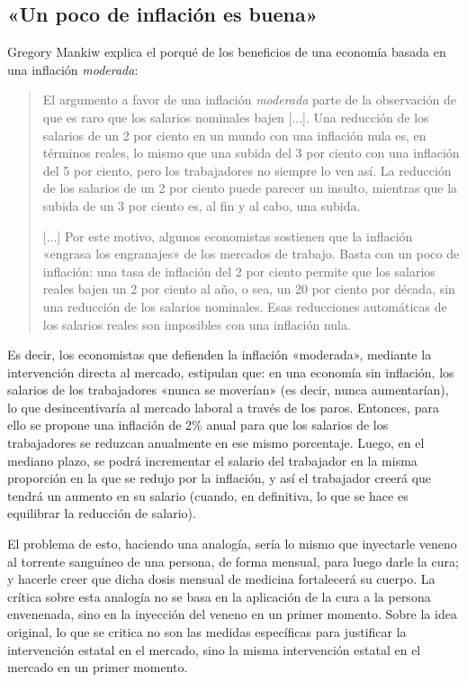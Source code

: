 \documentclass[12pt,a4paper,twoside]{book}
\begin{document}
\subsection{«Un poco de inflación es buena»}
Gregory Mankiw explica el porqué de los beneficios de una economía basada en una inflación \textit{moderada}:

\begin{quotation}
El argumento a favor de una inflación \textit{moderada} parte de la observación de que es raro que los salarios nominales bajen [...]. Una reducción de los salarios de un 2 por ciento en un mundo con una inflación nula es, en términos reales, lo mismo que una subida del 3 por ciento con una inflación del 5 por ciento, pero los trabajadores no siempre lo ven así. La reducción de los salarios de un 2 por ciento puede parecer un insulto, mientras que la subida de un 3 por ciento es, al fin y al cabo, una subida.

[...] Por este motivo, algunos economistas sostienen que la inflación «engrasa los engranajes» de los mercados de trabajo. Basta con un poco de inflación: una tasa de inflación del 2 por ciento permite que los salarios reales bajen un 2 por ciento al año, o sea, un 20 por ciento por década, sin una reducción de los salarios nominales. Esas reducciones automáticas de los salarios reales son imposibles con una inflación nula. \cite[págs. 198-199]{mankiw}
\end{quotation}

Es decir, los economistas que defienden la inflación «moderada», mediante la intervención directa al mercado, estipulan que: en una economía sin inflación, los salarios de los trabajadores «nunca se moverían» (es decir, nunca aumentarían), lo que desincentivaría al mercado laboral a través de los paros. Entonces, para ello se propone una inflación de 2\% anual para que los salarios de los trabajadores se reduzcan anualmente en ese mismo porcentaje. Luego, en el mediano plazo, se podrá incrementar el salario del trabajador en la misma proporción en la que se redujo por la inflación, y así el trabajador creerá que tendrá un aumento en su salario (cuando, en definitiva, lo que se hace es equilibrar la reducción de salario).

El problema de esto, haciendo una analogía, sería lo mismo que inyectarle veneno al torrente sanguíneo de una persona, de forma mensual, para luego darle la cura; y hacerle creer que dicha dosis mensual de medicina fortalecerá su cuerpo. La crítica sobre esta analogía no se basa en la aplicación de la cura a la persona envenenada, sino en la inyección del veneno en un primer momento. Sobre la idea original, lo que se critica no son las medidas específicas para justificar la intervención estatal en el mercado, sino la misma intervención estatal en el mercado en un primer momento. 
\end{document}
